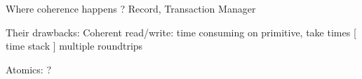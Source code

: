 


Where coherence happens ? 
Record, Transaction Manager



Their drawbacks: 
Coherent read/write: 
time consuming on primitive, take times [ time stack ]
multiple roundtrips

Atomics: ?


\subsection{}









